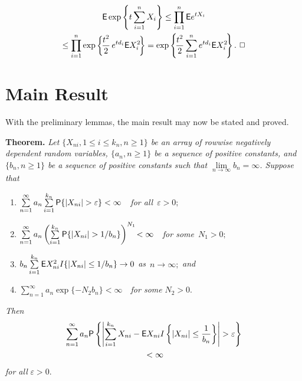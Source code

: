 \begin{multicols}{2}
\columnbreak

\noindent
\begin{multline*}
{\sf E} \exp\left\{t\sum\limits_{i=1}^n X_i\right\} \le \prod\limits_{i=1}^n {\sf E} e^{tX_i} \\
\hspace*{-3pt}{}\le \prod\limits_{i=1}^n \exp\left\{\!\displaystyle\frac{\displaystyle t^2\mathstrut}{\displaystyle 2\mathstrut}
\,e^{td_i} {\sf E}X_i^2 \!\right\}
=\exp\left\{\!\displaystyle\frac{\displaystyle t^2\mathstrut}{\displaystyle 2\mathstrut} \sum\limits_{i=1}^n e^{td_i} {\sf E}X_i^2\!\right\}.~\Box
\end{multline*}

\section{Main Result}

\noindent
With the preliminary lemmas, the  main result may now be stated and proved.

\medskip

\noindent 
\textbf{Theorem.} \textit{Let $\{X_{ni}, 1\le i \le k_n, n\ge 1\}$ be an array of rowwise negatively
dependent random variables, $\{a_n, n\ge 1\}$ be a sequence of positive constants, and $\{b_n, n\ge 1\}$ be a
sequence of positive constants such that $\lim\limits_{n\to\infty} b_n =\infty$. Suppose that}
\begin{enumerate}[($i$)]
\item $ \sum\limits_{n=1}^\infty a_n \sum\limits_{i=1}^{k_n} 
{\sf P}\{|X_{ni}|>\varepsilon\}<\infty$\ \textit{\ for all}\
$\varepsilon>0;$
\item $\sum\limits_{n=1}^\infty a_n \left(\sum\limits_{i=1}^{k_n}{\sf P}
\{ |X_{ni}|>1/b_n\} \right)^{N_1}\!<\infty$\
\textit{\ for some}\ $N_1>0;$
\item $b_n \sum\limits_{i=1}^{k_n} {\sf E} X_{ni}^2 I\{|X_{ni}|\le 1/b_n\} \to 0$ 
\textit{as}\ $n\to \infty;$ \textit{and}\
\item $\sum\limits_{n=1}^\infty a_n \exp\{-N_2 b_n\}<\infty$\ \textit{\ for some} $N_2>0.$
\end{enumerate}


\noindent
\textit{Then} 
\begin{multline*}
\sum\limits_{n=1}^\infty a_n {\sf P}\left\{\left| 
\sum\limits_{i=1}^{k_n} X_{ni}- {\sf E}X_{ni}I\left\{|X_{ni}|\le \fr{1}{b_n}
\right\}\right|> \varepsilon\right\}\\
{} <\infty
\end{multline*}
\textit{for all} $\varepsilon>0.$

\medskip 


\end{multicols}
